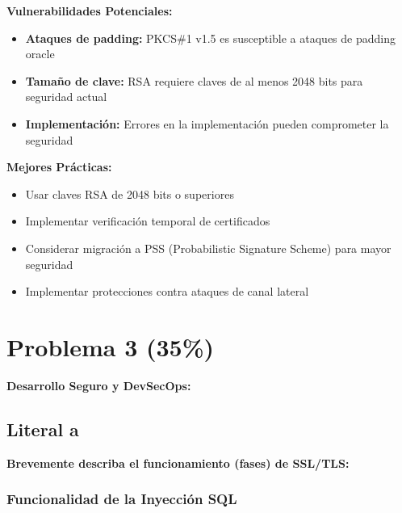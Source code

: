 {\textbf{Vulnerabilidades Potenciales:}
\begin{itemize}
    \item \textbf{Ataques de padding:} PKCS\#1 v1.5 es susceptible a ataques de padding oracle
    \item \textbf{Tamaño de clave:} RSA requiere claves de al menos 2048 bits para seguridad actual
    \item \textbf{Implementación:} Errores en la implementación pueden comprometer la seguridad
\end{itemize}

\textbf{Mejores Prácticas:}
\begin{itemize}
    \item Usar claves RSA de 2048 bits o superiores
    \item Implementar verificación temporal de certificados
    \item Considerar migración a PSS (Probabilistic Signature Scheme) para mayor seguridad
    \item Implementar protecciones contra ataques de canal lateral
\end{itemize}



















\section{Problema 3 (35\%)}
\textbf{Desarrollo Seguro y DevSecOps:}




\subsection{Literal a}
\textbf{Brevemente describa el funcionamiento (fases) de SSL/TLS:}


\subsubsection{Funcionalidad de la Inyección SQL}

}
